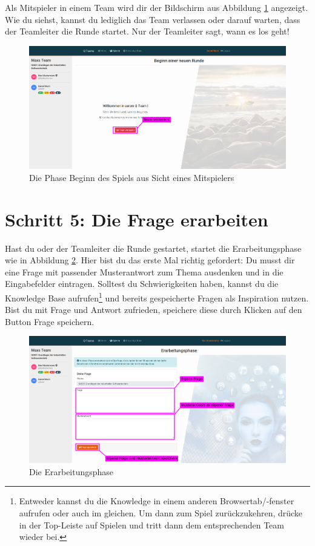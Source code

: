 \documentclass[a4paper,11pt,listof=numbered,glossary=totoc,parskip=half,toc=bib]{scrreprt}
\begin{document}
\begin{appendices}
	Als Mitspieler in einem Team wird dir der Bildschirm aus Abbildung \ref{fig:guide_beginn_spieler} angezeigt. Wie du siehst, kannst du lediglich das Team verlassen oder darauf warten, dass der Teamleiter die Runde startet. Nur der Teamleiter sagt, wann es los geht!
	\begin{figure}[h!]
		\centering
		\includegraphics[width=\textwidth]{UserGuide/Rundenbeginn_Spieler.png}
		\caption{Die Phase Beginn des Spiels aus Sicht eines Mitspielers}
		\label{fig:guide_beginn_spieler}
	\end{figure}
	
	\newpage
	\section*{Schritt 5: Die Frage erarbeiten}	
		
	Hast du oder der Teamleiter	 die Runde gestartet, startet die Erarbeitungsphase wie in Abbildung \ref{fig:guide_erarbeitungsphase}. Hier bist du das erste Mal richtig gefordert: Du musst dir eine Frage mit passender Musterantwort zum Thema ausdenken und in die Eingabefelder eintragen. Solltest du Schwierigkeiten haben, kannst du die Knowledge Base aufrufen\footnote{Entweder kannst du die Knowledge in einem anderen Browsertab/-fenster aufrufen oder auch im gleichen. Um dann zum Spiel zurückzukehren, drücke in der Top-Leiste auf Spielen und tritt dann dem entsprechenden Team wieder bei.} und bereits gespeicherte Fragen als Inspiration nutzen. Bist du mit Frage und Antwort zufrieden, speichere diese durch Klicken auf den Button Frage speichern. 
	\begin{figure}[h!]
		\centering
		\includegraphics[width=\textwidth]{UserGuide/Erarbeitungsphase.png}
		\caption{Die Erarbeitungsphase}
		\label{fig:guide_erarbeitungsphase}
	\end{figure}	
	

\end{appendices}
\end{document}
